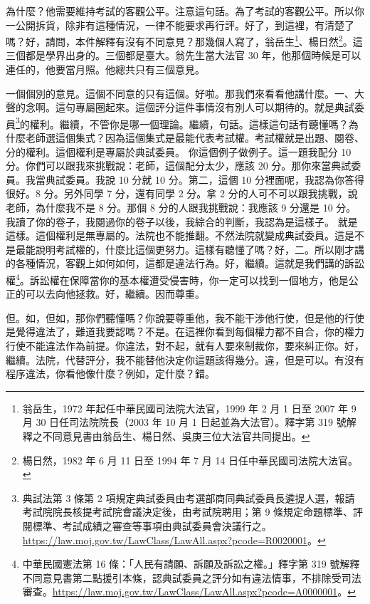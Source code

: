 \hypertarget{c08:cue:156}{}為什麼？他需要維持考試的客觀公平。注意這句話。為了考試的客觀公平。所以你一公開拆貨，除非有這種情況，一律不能要求再行評。好了，到這裡，有清楚了嗎？好，請問，本件解釋有沒有不同意見？那幾個人寫了，翁岳生\footnote{翁岳生，1972 年起任中華民國司法院大法官，1999 年 2 月 1 日至 2007 年 9 月 30 日任司法院院長（2003 年 10 月 1 日起並為大法官）。釋字第 319 號解釋之不同意見書由翁岳生、楊日然、吳庚三位大法官共同提出。}、楊日然\footnote{楊日然，1982 年 6 月 11 日至 1994 年 7 月 14 日任中華民國司法院大法官。}。這三個都是學界出身的。三個都是臺大。翁先生當大法官 30 年，他那個時候是可以連任的，他要當月照。他總共只有三個意見。

\hypertarget{c08:cue:157}{}一個個別的意見。這個不同意的只有這個。好啦。那我們來看看他講什麼。一、大聲的念啊。這句專屬圈起來。這個評分這件事情沒有別人可以期待的。就是典試委員\footnote{典試法第 3 條第 2 項規定典試委員由考選部商同典試委員長遴提人選，報請考試院院長核提考試院會議決定後，由考試院聘用；第 9 條規定命題標準、評閱標準、考試成績之審查等事項由典試委員會決議行之。\url{https://law.moj.gov.tw/LawClass/LawAll.aspx?pcode=R0020001}。}的權利。繼續，不管你是哪一個理論。繼續，句話。這樣這句話有聽懂嗎？為什麼老師選這個集式？因為這個集式是最能代表考試權。考試權就是出題、閱卷、分的權利。這個權利是專屬於典試委員。
\hypertarget{c08:cue:158}{}你這個例子做例子。這一題我配分 10 分。你們可以跟我來挑戰說：老師，這個配分太少，應該 20 分。那你來當典試委員。我當典試委員。我說 10 分就 10 分。第二，這個 10 分裡面呢，我認為你答得很好。8 分。另外同學 7 分，還有同學 2 分。拿 2 分的人可不可以跟我挑戰，說老師，為什麼我不是 8 分。那個 8 分的人跟我挑戰說：我應該 9 分還是 10 分。我讀了你的卷子，我閱過你的卷子以後，我綜合的判斷，我認為是這樣子。
\hypertarget{c08:cue:159}{}就是這樣。這個權利是無專屬的。法院也不能推翻。不然法院就變成典試委員。這是不是最能說明考試權的，什麼比這個更努力。這樣有聽懂了嗎？好，二。所以剛才講的各種情況，客觀上如何如何，這都是違法行為。好，繼續。這就是我們講的訴訟權\footnote{中華民國憲法第 16 條：「人民有請願、訴願及訴訟之權。」釋字第 319 號解釋不同意見書第二點援引本條，認典試委員之評分如有違法情事，不排除受司法審查。\url{https://law.moj.gov.tw/LawClass/LawAll.aspx?pcode=A0000001}。}。訴訟權在保障當你的基本權遭受侵害時，你一定可以找到一個地方，他是公正的可以去向他拯救。好，繼續。因而尊重。

\hypertarget{c08:cue:160}{}但。如，但如，那你們聽懂嗎？你說要尊重他，我不能干涉他行使，但是他的行使是覺得違法了，難道我要認嗎？不是。在這裡你看到每個權力都不自合，你的權力行使不能違法作為前提。你違法，對不起，就有人要來制裁你，要來糾正你。好，繼續。法院，代替評分，我不能替他決定你這題該得幾分。違，但是可以。有沒有程序違法，你看他像什麼？例如，定什麼？錯。

